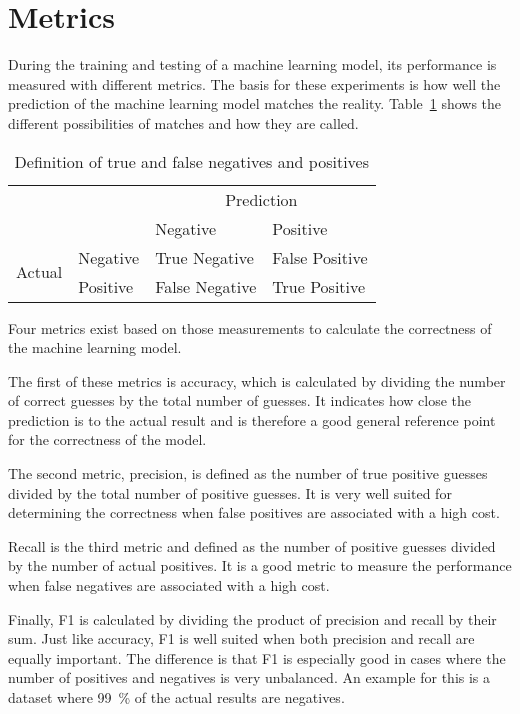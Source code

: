 \section{Metrics}\label{sec:metrics} %
During the training and testing of a machine learning model, its performance is measured with different metrics. The basis for these experiments is how well the prediction of the machine learning model matches the reality. Table~\ref{table:true-false-neg-pos} shows the different possibilities of matches and how they are called. %

\begin{table}[ht]
  \centering
  \caption{Definition of true and false negatives and positives} %
  \begin{tabular}{ll|l|l} %
                            & \multicolumn{1}{c}{} & \multicolumn{2}{c}{Prediction}                  \\
                            &                      & Negative                       & Positive       \\ \cline{2-4}
    \multirow{2}{*}{Actual} & Negative             & True Negative                  & False Positive \\ \cline{2-4}
                            & Positive             & False Negative                 & True Positive  \\
  \end{tabular}\label{table:true-false-neg-pos}
\end{table}

Four metrics exist based on those measurements to calculate the correctness of the machine learning model.

The first of these metrics is accuracy, which is calculated by dividing the number of correct guesses by the total number of guesses. It indicates how close the prediction is to the actual result and is therefore a good general reference point for the correctness of the model.

The second metric, precision, is defined as the number of true positive guesses divided by the total number of positive guesses. It is very well suited for determining the correctness when false positives are associated with a high cost.

Recall is the third metric and defined as the number of positive guesses divided by the number of actual positives. It is a good metric to measure the performance when false negatives are associated with a high cost.

Finally, F1 is calculated by dividing the product of precision and recall by their sum. Just like accuracy, F1 is well suited when both precision and recall are equally important. The difference is that F1 is especially good in cases where the number of positives and negatives is very unbalanced. An example for this is a dataset where \SI{99}{\percent} of the actual results are negatives.
